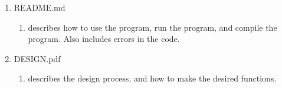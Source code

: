 \documentclass[11pt]{article}
\begin{document}
\begin{enumerate}
\begin{enumerate}
	\end{enumerate}
	\item README.md
	\begin{enumerate}
		\item describes how to use the program, run the program, and compile the program. Also includes errors in the code.
	\end{enumerate}
	\item DESIGN.pdf
	\begin{enumerate}
		\item describes the design process, and how to make the desired functions.
	\end{enumerate}
\end{enumerate}
\end{document}
